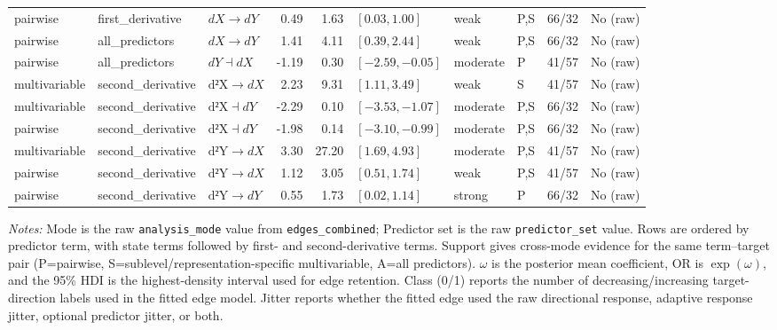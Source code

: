 \begin{table}[t!]
\begin{tabular}{@{}lp{}p{}rrp{}llll@{}}
pairwise & first\_derivative & $dX \longrightarrow dY$ & 0.49 & 1.63 & $[0.03, 1.00]$ & weak & P,S & 66/32 & No (raw) \\
pairwise & all\_predictors & $dX \longrightarrow dY$ & 1.41 & 4.11 & $[0.39, 2.44]$ & weak & P,S & 66/32 & No (raw) \\
pairwise & all\_predictors & $dY \dashv dX$ & -1.19 & 0.30 & $[-2.59, -0.05]$ & moderate & P & 41/57 & No (raw) \\
multivariable & second\_derivative & $\mathrm{d²X} \longrightarrow dX$ & 2.23 & 9.31 & $[1.11, 3.49]$ & weak & S & 41/57 & No (raw) \\
multivariable & second\_derivative & $\mathrm{d²X} \dashv dY$ & -2.29 & 0.10 & $[-3.53, -1.07]$ & moderate & P,S & 66/32 & No (raw) \\
pairwise & second\_derivative & $\mathrm{d²X} \dashv dY$ & -1.98 & 0.14 & $[-3.10, -0.99]$ & moderate & P,S & 66/32 & No (raw) \\
multivariable & second\_derivative & $\mathrm{d²Y} \longrightarrow dX$ & 3.30 & 27.20 & $[1.69, 4.93]$ & moderate & P,S & 41/57 & No (raw) \\
pairwise & second\_derivative & $\mathrm{d²Y} \longrightarrow dX$ & 1.12 & 3.05 & $[0.51, 1.74]$ & weak & P,S & 41/57 & No (raw) \\
pairwise & second\_derivative & $\mathrm{d²Y} \longrightarrow dY$ & 0.55 & 1.73 & $[0.02, 1.14]$ & strong & P & 66/32 & No (raw) \\
\bottomrule
\end{tabular}

\vspace{1mm}
\footnotesize
\textit{Notes:} Mode is the raw \texttt{analysis\_mode} value from \texttt{edges\_combined}; Predictor set is the raw \texttt{predictor\_set} value. Rows are ordered by predictor term, with state terms followed by first- and second-derivative terms. Support gives cross-mode evidence for the same term--target pair (P=pairwise, S=sublevel/representation-specific multivariable, A=all predictors). $\omega$ is the posterior mean coefficient, OR is $\exp(\omega)$, and the 95\% HDI is the highest-density interval used for edge retention. Class (0/1) reports the number of decreasing/increasing target-direction labels used in the fitted edge model. Jitter reports whether the fitted edge used the raw directional response, adaptive response jitter, optional predictor jitter, or both.
\end{table}
